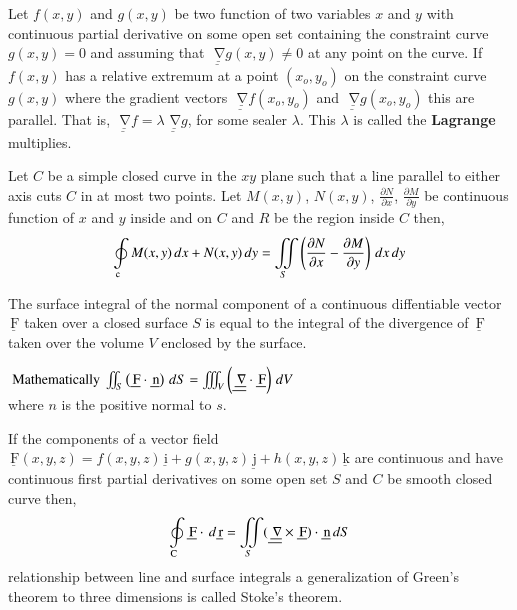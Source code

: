 \documentclass[11pt]{extarticle}
\renewcommand{\vec}[1]{\underline{\,\mathrm{#1}}}
\newcommand{\dx}{{\,dx}}
\newcommand{\dy}{{\,dy}}
\newcommand{\dS}{{\,dS}}
\newcommand{\dvr}{{\,d\vec{r}}}
\let\oldnabla\nabla
\renewcommand{\nabla}{\vec{\oldnabla}}
\newcommand{\F}{\vec{F}}
\newcommand{\osint}[1][]{\oint\displaylimits_\mathrm{#1}}
\newcommand{\miint}{\iint\displaylimits}
\newcommand{\miiint}{\iiint\displaylimits}
\begin{document}

   
\pagebreak

Let $f(x, y)$ and $g(x, y)$ be two function of two variables $x$ and $y$ with continuous partial derivative on some open set containing the constraint curve $g(x, y)=0$ and assuming that $\vec{\nabla}g(x, y) \neq 0$ at any point on the curve. 
If $f(x,y)$ has a relative extremum at a point $(x_o, y_o)$ on the constraint curve $g(x, y)$ where the gradient vectors $\vec{\nabla} f\left(x_o, y_o\right)$ and $\vec{\nabla} g\left(x_o, y_o\right)$ this are parallel. That is, $\vec{\nabla} f=\lambda \vec{\nabla} g$, for some sealer $\lambda$. This $\lambda$ is called the \textbf{Lagrange} multiplies.

Let $C$ be a simple closed curve in the $xy$ plane such that a line parallel to either axis cuts $C$ in at most two points.
Let $M(x,y)$, $N(x,y)$, $\frac{\partial N}{\partial x}$, $\frac{\partial M}{\partial y}$ be continuous function of $x$ and $y$ inside and on $C$ and $R$ be the region inside $C$ then, $$\osint[c] M(x,y)\dx+N(x,y)\dy = \miint_S \left(\frac{\partial N}{\partial x} - \frac{\partial M}{\partial y}\right) \dx\dy$$


The surface integral of the normal component of a continuous diffentiable vector $\vec{F}$ taken over a closed surface $S$ is equal to the integral of the divergence of $\vec{F}$ taken over the volume $V$ enclosed by the surface.

\vspace{-\baselineskip}
\begin{center}
   $\text { Mathematically } \miint_S \left(\vec{F} \cdot \vec{n}\right) \dS =\miiint_V \left(\nabla \cdot \vec{F}\right) \,dV$\\[1.5ex]
   where $n$ is the positive normal to $s$.
\end{center}

If the components of a vector field $\vec{F}(x,y,z) = f(x,y,z)\vec{i}+g(x,y,z)\vec{j}+h(x,y,z)\vec{k}$ are continuous and have continuous first partial derivatives on some open set $S$ and $C$ be smooth closed curve then, $$\osint[C]\vec{F} \cdot \dvr = \miint_S(\nabla\times\F) \cdot \vec{n} \dS$$
relationship between line and surface integrals a generalization of Green's theorem to three dimensions is called Stoke's theorem.
\end{document}
